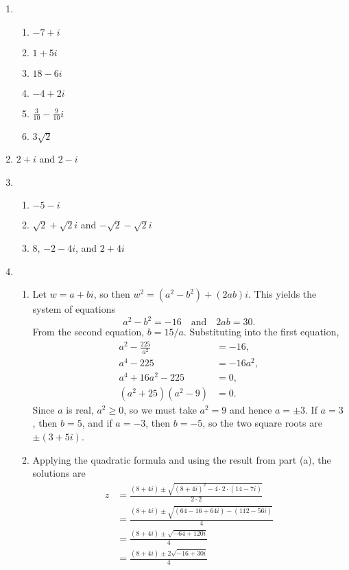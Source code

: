 \begin{enumerate}
\item \begin{enumerate}
\item $-7 + i$
\item $1 + 5i$
\item $18 - 6i$
\item $-4 + 2i$
\item $\frac{3}{10} - \frac{9}{10}i$
\item $3\sqrt{2}$
\end{enumerate}
\item $2 + i$ and $2 - i$
\item \begin{enumerate}
\item $-5 - i$
\item $\sqrt{2} + \sqrt{2}i$ and $-\sqrt{2} - \sqrt{2}i$
\item $8$, $-2 - 4i$, and $2 + 4i$
\end{enumerate}
\item \begin{enumerate}
\item Let $w = a + bi$, so then $w^2 = (a^2 - b^2) + (2ab)i$. This yields the system of equations
\begin{equation*}
a^2 - b^2 = -16\quad\text{and}\quad 2ab = 30.
\end{equation*}
From the second equation, $b = 15/a$. Substituting into the first equation,
\begin{align*}
a^2 - \frac{225}{a^2} &= -16, \\
a^4 - 225 &= -16a^2, \\
a^4 + 16a^2 - 225 &= 0, \\
(a^2 + 25)(a^2 - 9) &= 0.
\end{align*}
Since $a$ is real, $a^2\geq 0$, so we must take $a^2 = 9$ and hence $a = \pm 3$. If $a = 3$, then $b = 5$, and if $a = -3$, then $b = -5$, so the two square roots are $\pm (3 + 5i)$.
\item Applying the quadratic formula and using the result from part (a), the solutions are
\begin{align*}
z &= \frac{(8 + 4i)\pm\sqrt{(8 + 4i)^2 - 4\cdot 2\cdot (14 - 7i)}}{2\cdot 2} \\
&= \frac{(8 + 4i)\pm\sqrt{(64 - 16 + 64i) - (112 - 56i)}}{4} \\
&= \frac{(8 + 4i)\pm\sqrt{-64 + 120i}}{4} \\
&= \frac{(8 + 4i)\pm 2\sqrt{-16 + 30i}}{4} \\

\end{align*}
\end{enumerate}
\end{enumerate}
